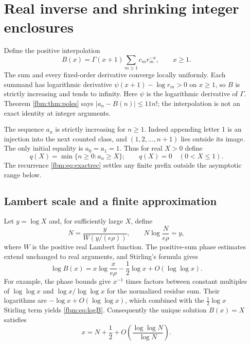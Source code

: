 \documentclass[11pt]{article}
\theoremstyle{remark}\newtheorem{remark}[theorem]{Remark}
\begin{document}
\section{Real inverse and shrinking integer enclosures}\label{fbm:sec:inverse}
Define the positive interpolation
\begin{equation}\label{fbm:eq:interpolation}
 B(x)=\Gamma(x+1)\sum_{m\geq1}c_mr_m^{-x},\qquad x\geq1.
\end{equation}
The sum and every fixed-order derivative converge locally uniformly. Each summand has logarithmic derivative $\psi(x+1)-\log r_m>0$ on $x\geq1$, so $B$ is strictly increasing and tends to infinity. Here $\psi$ is the logarithmic derivative of $\Gamma$. Theorem \ref{fbm:thm:poles} says $|a_n-B(n)|\leq11n!$; the interpolation is not an exact identity at integer arguments.

The sequence $a_n$ is strictly increasing for $n\geq1$. Indeed appending letter 1 is an injection into the next counted class, and $(1,2,\ldots,n+1)$ lies outside its image. The only initial equality is $a_0=a_1=1$. Thus for real $X>0$ define
\[
 q(X)=\min\{n\geq0:a_n\geq X\};\qquad q(X)=0\quad(0<X\leq1).
\]
The recurrence \eqref{fbm:eq:exactrec} settles any finite prefix outside the asymptotic range below.

\subsection{Lambert scale and a finite approximation}
Let $y=\log X$ and, for sufficiently large $X$, define
\begin{equation}\label{fbm:eq:N}
 N=\frac{y}{W(y/(e\rho))},\qquad N\log\frac{N}{e\rho}=y,
\end{equation}
where $W$ is the positive real Lambert function. The positive-sum phase estimates extend unchanged to real arguments, and Stirling's formula gives
\begin{equation}\label{fbm:eq:logB}
 \log B(x)=x\log\frac{x}{e\rho}-\frac12\log x+O(\log\log x).
\end{equation}
For example, the phase bounds give $x^{-1}$ times factors between constant multiples of $\log\log x$ and $\log x/\log\log x$ for the normalized residue sum. Their logarithms are $-\log x+O(\log\log x)$, which combined with the $\tfrac12\log x$ Stirling term yields \eqref{fbm:eq:logB}. Consequently the unique solution $B(x)=X$ satisfies
\begin{equation}\label{fbm:eq:xlocation}
 x=N+\frac12+O\!\left(\frac{\log\log N}{\log N}\right).
\end{equation}
\end{document}
